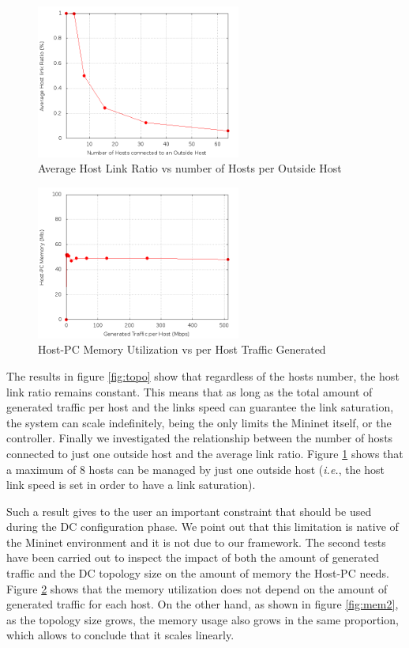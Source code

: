 \documentclass[12pt,english,oneside]{book}
\begin{document}
\begin{figure}[htbp]
        \centering
        \includegraphics[width=0.6\textwidth]{figures/out_hosts_ratio.png}
        \caption{Average Host Link Ratio vs number of Hosts per Outside Host}
        \label{fig:hosts}
\end{figure}
\begin{figure}[htbp]
        \centering
        \includegraphics[width=0.6\textwidth]{figures/mem1_utilization.png}
        \caption{Host-PC Memory Utilization vs per Host Traffic Generated}
        \label{fig:mem1}
\end{figure}

The results in figure \ref{fig:topo} show that regardless of the hosts number, the host link ratio remains constant.
This means that as long as the total amount of generated traffic per host and the links speed can guarantee the link saturation, the system can scale indefinitely, being the only limits the Mininet itself, or the controller. 
Finally we investigated the relationship between the number of hosts connected to just one outside host and the average link ratio.
Figure \ref{fig:hosts} shows that a maximum of $8$ hosts can be managed by just one outside host (\textit{i.e.}, the host link speed is set in order to have a link saturation).

Such a result gives to the user an important constraint that should be used during the DC configuration phase.
We point out that this limitation is native of the Mininet environment and it is not due to our framework.
The second tests have been carried out to inspect the impact of both the amount of generated traffic and the DC topology size on the amount of memory the Host-PC needs.
Figure \ref{fig:mem1} shows that the memory utilization does not depend on the amount of generated traffic for each host.
On the other hand, as shown in figure \ref{fig:mem2}, as the topology size grows, the memory usage also grows in the same proportion, which allows to conclude that it scales linearly.
\end{document}
